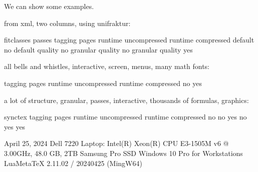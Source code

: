 \blank[2*big]

We can show some examples.

\stoptitle

\starttitle[title={Impact: King James Bible}]

from xml, two columns, using unifraktur:

\starttabulate[|c|c|c|c|c|c|c|c|]
\BC fitclasses \BC passes  \BC tagging \BC pages \BC runtime \BC uncompressed \BC runtime \BC compressed \NC \NR
\HL
\NC default    \NC         \NC no             \NC              \NC         \NC            \NC \NR
\NC default    \NC quality \NC no             \NC              \NC         \NC            \NC \NR
\NC granular   \NC quality \NC no                              \NC \NR
\NC granular   \NC quality \NC yes                             \NC \NR
\stoptabulate

\stoptitle

\starttitle[title={Impact: Math in \CONTEXT}]

all bells and whistles, interactive, screen, menus, many math fonts:

\starttabulate[|c|c|c|c|c|c|]
\BC tagging \BC pages \BC runtime \BC uncompressed \BC runtime \BC compressed \NC \NR
\HL
\NC no                              \NC \NR
\NC yes                             \NC \NR
\stoptabulate

\stoptitle

\starttitle[title={Impact: Infinitesimalkalkyl}]

a lot of structure, granular, passes, interactive, thousands of formulas, graphics:

\starttabulate[|c|c|c|c|c|c|c|]
\BC synctex \BC tagging \BC pages \BC runtime \BC uncompressed \BC runtime \BC compressed \NC \NR
\HL
\NC no      \BC no         \NC         \NC              {}          \NC \NR
\NC yes     \BC no                              \NC \NR
\NC yes     \BC yes                             \NC \NR
\stoptabulate


\vfill

\startlines[style=\small\small\small\tt,after=]
April 25, 2024
Dell 7220 Laptop: Intel(R) Xeon(R) CPU E3-1505M v6 @ 3.00GHz, 48.0 GB, 2TB Samsung Pro SSD
Windows 10 Pro for Workstations
LuaMetaTeX 2.11.02 / 20240425 (MingW64)
\stoplines

\stoptitle

\stopdocument

